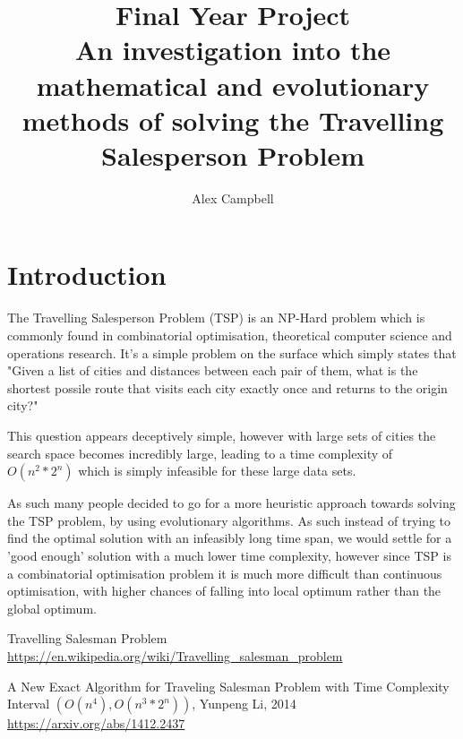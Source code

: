 \documentclass[12pt,a4paper,titlepage]{article}
\title{Final Year Project\\[1em]
\large An investigation into the mathematical and evolutionary methods of solving the Travelling Salesperson Problem}
\author{Alex Campbell}
\date{}
\begin{document}
\maketitle

\section*{Introduction}
The Travelling Salesperson Problem (TSP) is an NP-Hard problem which is commonly found in combinatorial optimisation, theoretical computer science and operations research. It's a simple problem on the surface which simply states that "Given a list of cities and distances between each pair of them, what is the shortest possile route that visits each city exactly once and returns to the origin city?" \cite{TSPWiki}

This question appears deceptively simple, however with large sets of cities the search space becomes incredibly large, leading to a time complexity of $O(n^2*2^n)$ \cite{li2014new} which is simply infeasible for these large data sets.

As such many people decided to go for a more heuristic approach towards solving the TSP problem, by using evolutionary algorithms. As such instead of trying to find the optimal solution with an infeasibly long time span, we would settle for a 'good enough' solution with a much lower time complexity, however since TSP is a combinatorial optimisation problem it is much more difficult than continuous optimisation, with higher chances of falling into local optimum rather than the global optimum.

\begin{appendices}
\end{appendices}

\begin{thebibliography}{1}

Travelling Salesman Problem
\\\url{https://en.wikipedia.org/wiki/Travelling_salesman_problem}

A New Exact Algorithm for Traveling Salesman Problem with Time Complexity Interval $(O(n^4), O(n^3*2^n))$, Yunpeng Li, 2014
\\\url{https://arxiv.org/abs/1412.2437}

\end{thebibliography}
\end{document}
